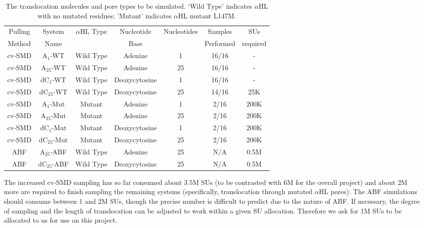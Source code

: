 \documentclass[a4paper,10pt]{article}
\newcommand{\dctfnsp}{dC$_{25}$}
\newcommand{\atfnsp}{A$_{25}$}
\newcommand{\dconsp}{dC$_{1}$}
\newcommand{\aonsp}{A$_{1}$}
\newcommand{\ahl}{$\alpha$HL }
\begin{document}
\begin{table}[!h]
\begin{center}
  \caption{The translocation molecules and pore types
to be simulated. `Wild Type' indicates \ahl with no mutated residues;
'Mutant' indicates \ahl mutant L147M.\newline  
}
\label{table:systems}
\begin{tabular}{| c | c | c | c | c | c | c |}
\hline
Pulling & System & \ahl Type & Nucleotide & Nucleotides & Samples &
SUs \\
Method & Name &  & Base &  & Performed & required \\
\hline
cv-SMD & \aonsp-WT & Wild Type & Adenine & 1 & 16/16 & - \\
cv-SMD & \atfnsp-WT & Wild Type & Adenine & 25 & 16/16 & - \\
cv-SMD & \dconsp-WT & Wild Type & Deoxycytosine & 1 & 16/16 & - \\
cv-SMD & \dctfnsp-WT & Wild Type & Deoxycytosine & 25 & 14/16 & 25K\\
cv-SMD & \aonsp-Mut & Mutant & Adenine & 1 & 2/16 & 200K \\
cv-SMD & \atfnsp-Mut & Mutant & Adenine & 25 & 2/16 & 200K \\
cv-SMD & \dconsp-Mut & Mutant & Deoxycytosine & 1 & 2/16 & 200K \\
cv-SMD & \dctfnsp-Mut & Mutant & Deoxycytosine & 25 & 2/16 & 200K \\
ABF & \atfnsp-ABF & Wild Type & Adenine & 25 & N/A & 0.5M \\
ABF & \dctfnsp-ABF & Wild Type & Deoxycytosine & 25 & N/A & 0.5M \\
\hline
\end{tabular}
\end{center}
\end{table}


The increased cv-SMD sampling has so far consumed about 3.5M SUs (to be contrasted with 6M for the overall project) and about 
2M more are required to finish sampling the remaining systems (specifically, translocation through mutated \ahl pores).  The ABF simulations should consume between 1 and 2M SUs, though the precise number is difficult to predict due to the nature of ABF. If necessary, the degree of sampling and the length of translocation can be adjusted to work within a given SU allocation. Therefore we ask for 1M SUs to be allocated to us for use on this project.
\end{document}

